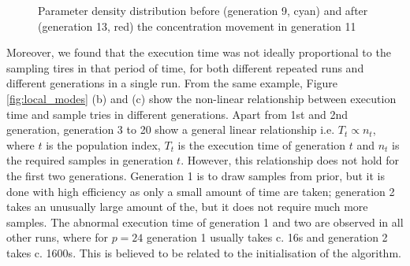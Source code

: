 \begin{figure}[t]
    \begin{center}
    \end{center}

    \caption[Parameter density distribution before and after the concentration movement in generation 11]{Parameter density distribution before (generation 9, cyan) and after (generation 13, red) the concentration movement in generation 11}
    \label{fig:local_para}
\end{figure}

Moreover, we found that the execution time was not ideally proportional to the sampling tires in that period of time, for both different repeated runs and different generations in a single run. From the same example, Figure \ref{fig:local_modes} (b) and (c) show the non-linear relationship between execution time and sample tries in different generations. Apart from 1st and 2nd generation, generation 3 to 20 show a general linear relationship i.e. $T_t\propto n_t$, where $t$ is the population index, $T_t$ is the execution time of generation $t$ and $n_t$ is the required samples in generation $t$. However, this relationship does not hold for the first two generations. Generation 1 is to draw samples from prior, but it is done with high efficiency as only a small amount of time are taken; generation 2 takes an unusually large amount of the, but it does not require much more samples. The abnormal execution time of generation 1 and two are observed in all other runs, where for $p=24$ generation 1 usually takes c. 16s and generation 2 takes c. 1600s. This is believed to be related to the initialisation of the algorithm. 

